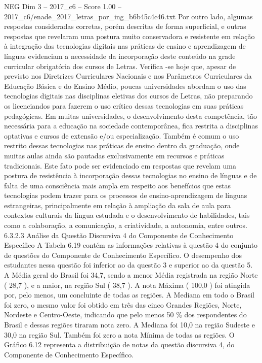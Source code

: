 \begin{textsample}{NEG Dim 3 – 2017\_c6 – Score 1.00 – 2017\_c6/enade\_2017\_letras\_por\_ing\_b6b45c4c46.txt}
Por outro lado, algumas respostas consideradas corretas, porém descritas de forma superficial, e outras respostas que revelaram uma postura muito conservadora e resistente em relação à integração das tecnologias digitais nas práticas de ensino e aprendizagem de línguas evidenciam a necessidade da incorporação deste conteúdo na grade curricular obrigatória dos cursos de Letras.
Verifica -se hoje que, apesar de previsto nos Diretrizes Curriculares Nacionais e nos Parâmetros Curriculares da Educação Básica e do Ensino Médio, poucas universidades abordam o uso das tecnologias digitais nas disciplinas eletivas dos cursos de Letras, não preparando os licenciandos para fazerem o uso crítico dessas tecnologias em suas práticas pedagógicas.
Em muitas universidades, o desenvolvimento desta competência, tão necessária para a educação na sociedade contemporânea, fica restrita a disciplinas optativas e cursos de extensão e/ou especialização.
Também é comum o uso restrito dessas tecnologias nas práticas de ensino dentro da graduação, onde muitas aulas ainda são pautadas exclusivamente em recursos e práticas tradicionais.
Este fato pode ser evidenciado em respostas que revelam uma postura de resistência à incorporação dessas tecnologias no ensino de línguas e de falta de uma consciência mais ampla em respeito aos benefícios que estas tecnologias podem trazer para os processos de ensino-aprendizagem de línguas estrangeiras, principalmente em relação à ampliação da sala de aula para contextos culturais da língua estudada e o desenvolvimento de habilidades, tais como a colaboração, a comunicação, a criatividade, a autonomia, entre outros. 6.3.2.3 Análise da Questão Discursiva 4 do Componente de Conhecimento Específico A Tabela 6.19 contém as informações relativas à questão 4 do conjunto de questões do Componente de Conhecimento Específico.
O desempenho dos estudantes nessa questão foi inferior ao da questão 3 e superior ao da questão 5.
A Média geral do Brasil foi 34,7, sendo a menor Média registrada na região Norte ( 28,7 ), e a maior, na região Sul ( 38,7 ).
A nota Máxima ( 100,0 ) foi atingida por, pelo menos, um concluinte de todas as regiões.
A Mediana em todo o Brasil foi zero, o mesmo valor foi obtido em três das cinco Grandes Regiões, Norte, Nordeste e Centro-Oeste, indicando que pelo menos 50 \% dos respondentes do Brasil e dessas regiões tiraram nota zero.
A Mediana foi 10,0 na região Sudeste e 30,0 na região Sul.
Também foi zero a nota Mínima de todas as regiões.
O Gráfico 6.12 representa a distribuição de notas da questão discursiva 4, do Componente de Conhecimento Específico.

\end{textsample}
